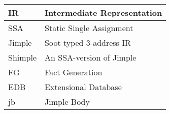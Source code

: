 \documentclass{dithesis}
\begin{document}
\begin{thesisabbreviations}
	\begin{tabularx}{\textwidth}{|X|X|}
        \hline
        IR & Intermediate Representation \\
        \hline
        SSA & Static Single Assignment \\
        \hline
        Jimple & Soot typed 3-address IR \\
        \hline
        Shimple & An SSA-version of Jimple \\
        \hline
        FG & Fact Generation \\
        \hline
        EDB & Extensional Database \\
        \hline
        jb & Jimple Body \\
		\hline
	\end{tabularx}
\end{thesisabbreviations}
\end{document}
